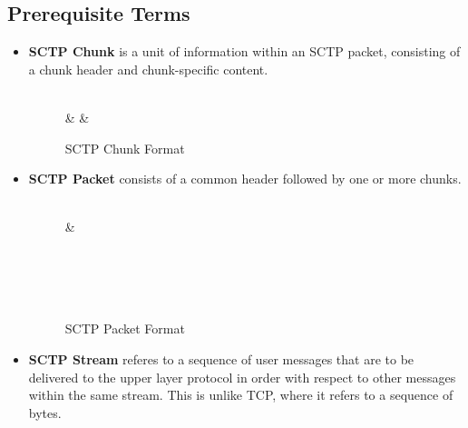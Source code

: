 \documentclass[a4paper,11pt]{article}
\begin{document}
\subsection{Prerequisite Terms}
\begin{itemize}
\item \textbf{SCTP Chunk} is a unit of information within an SCTP packet,
consisting of a chunk header and chunk-specific content.

\begin{figure}[h]
	\centering
	\begin{bytefield}[bitwidth=1.1em]{32}
	\\
	 &  & \\
	\end{bytefield}
	\caption{SCTP Chunk Format \cite{rfc4960}}
\end{figure}

\item \textbf{SCTP Packet} consists of a common header followed by one or
	more chunks.
\begin{figure}[h]
	\centering
	\begin{bytefield}[bitwidth=1.1em]{32}
	\\
	 & \\
	\\
	\\
	\\
	\\
	\end{bytefield}
	\caption{SCTP Packet Format \cite{rfc4960}}
\end{figure}

\item \textbf{SCTP Stream} referes to a sequence of user messages that are to be
	delivered to the upper layer protocol in order with respect to other
	messages within the same stream. This is unlike TCP, where it refers
	to a sequence of bytes.
\end{itemize}


\clearpage
\end{document}
